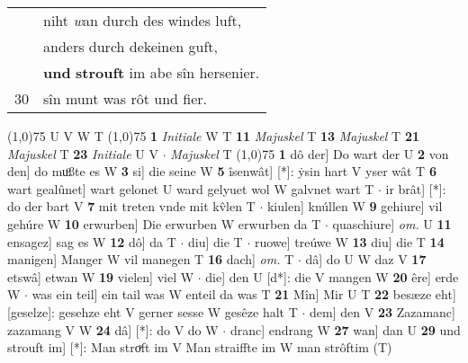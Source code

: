 \documentclass[8pt,a4paper,notitlepage]{article}
\begin{document}
\begin{table}[ht]
\begin{minipage}[t]{0.5\linewidth}
\begin{tabular}{rl}
 & niht \textit{w}an durch des windes luft,\\ 
 & anders durch dekeinen guft,\\ 
 & \textbf{und} \textbf{strouft} im abe sîn hersenier.\\ 
30 & sîn munt was rôt und fier.\\ 
\end{tabular}
\scriptsize
\line(1,0){75} \newline
U V W T \newline
\line(1,0){75} \newline
\textbf{1} \textit{Initiale} W T  \textbf{11} \textit{Majuskel} T  \textbf{13} \textit{Majuskel} T  \textbf{21} \textit{Majuskel} T  \textbf{23} \textit{Initiale} U V   $\cdot$ \textit{Majuskel} T  \newline
\line(1,0){75} \newline
\textbf{1} dô der] Do wart der U \textbf{2} von den] do muͦßte es W \textbf{3} si] die seine W \textbf{5} îsenwât] [*]: ẏsin hart V yser wât T \textbf{6} wart gealûnet] wart gelonet U ward gelyuet wol W galvnet wart T  $\cdot$ ir brât] [*]: do der bart V \textbf{7} mit treten vnde mit kv̂len T  $\cdot$ kiulen] knúllen W \textbf{9} gehiure] vil gehúre W \textbf{10} erwurben] Die erwurben W erwurben da T  $\cdot$ quaschiure] \textit{om.} U \textbf{11} ensagez] sag es W \textbf{12} dô] da T  $\cdot$ diu] die T  $\cdot$ ruowe] treúwe W \textbf{13} diu] die T \textbf{14} manigen] Manger W vil manegen T \textbf{16} dach] \textit{om.} T  $\cdot$ dâ] do U W daz V \textbf{17} etswâ] etwan W \textbf{19} vielen] viel W  $\cdot$ die] den U [d*]: die V mangen W \textbf{20} êre] erde W  $\cdot$ was ein teil] ein tail was W enteil da was T \textbf{21} Mîn] Mir U T \textbf{22} besæze eht] [geselze]: gesehze eht V gerner sesse W gesêze halt T  $\cdot$ dem] den V \textbf{23} Zazamanc] zazamang V W \textbf{24} dâ] [*]: do V do W  $\cdot$ dranc] endrang W \textbf{27} wan] dan U \textbf{29} und strouft im] [*]: Man stroͮft im V Man straiffte im W man strôftim (T) \newline
\end{minipage}
\end{table}
\end{document}
